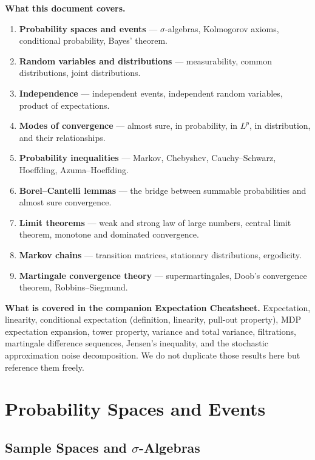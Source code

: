 \documentclass[11pt,a4paper]{article}
\theoremstyle{definition}
\theoremstyle{plain}
\theoremstyle{remark}
\begin{document}
\medskip\noindent\textbf{What this document covers.}
\begin{enumerate}[nosep]
    \item \textbf{Probability spaces and events} --- $\sigma$-algebras, Kolmogorov axioms, conditional probability, Bayes' theorem.
    \item \textbf{Random variables and distributions} --- measurability, common distributions, joint distributions.
    \item \textbf{Independence} --- independent events, independent random variables, product of expectations.
    \item \textbf{Modes of convergence} --- almost sure, in probability, in $L^p$, in distribution, and their relationships.
    \item \textbf{Probability inequalities} --- Markov, Chebyshev, Cauchy--Schwarz, Hoeffding, Azuma--Hoeffding.
    \item \textbf{Borel--Cantelli lemmas} --- the bridge between summable probabilities and almost sure convergence.
    \item \textbf{Limit theorems} --- weak and strong law of large numbers, central limit theorem, monotone and dominated convergence.
    \item \textbf{Markov chains} --- transition matrices, stationary distributions, ergodicity.
    \item \textbf{Martingale convergence theory} --- supermartingales, Doob's convergence theorem, Robbins--Siegmund.
\end{enumerate}

\medskip\noindent\textbf{What is covered in the companion Expectation Cheatsheet.}
Expectation, linearity, conditional expectation (definition, linearity, pull-out
property), MDP expectation expansion, tower property, variance and total variance,
filtrations, martingale difference sequences, Jensen's inequality, and the
stochastic approximation noise decomposition. We do not duplicate those results here
but reference them freely.

\section{Probability Spaces and Events}
\label{sec:prob_spaces}

\subsection{Sample Spaces and \texorpdfstring{$\sigma$}{Sigma}-Algebras}
\label{subsec:sigma_algebras}
\end{document}
